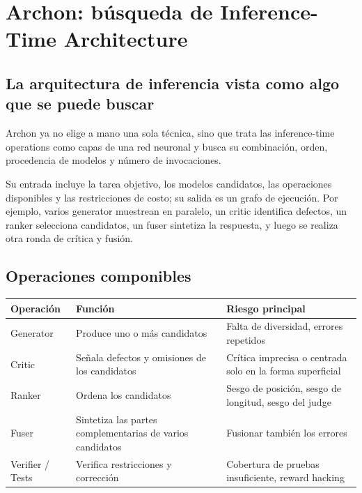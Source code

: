 \section{Archon: búsqueda de Inference-Time Architecture}

\subsection{La arquitectura de inferencia vista como algo que se puede buscar}

Archon ya no elige a mano una sola técnica, sino que trata las inference-time operations como capas de una red neuronal y busca su combinación, orden, procedencia de modelos y número de invocaciones.


Su entrada incluye la tarea objetivo, los modelos candidatos, las operaciones disponibles y las restricciones de costo; su salida es un grafo de ejecución. Por ejemplo, varios generator muestrean en paralelo, un critic identifica defectos, un ranker selecciona candidatos, un fuser sintetiza la respuesta, y luego se realiza otra ronda de crítica y fusión.

\subsection{Operaciones componibles}


\begin{table}[H]
\centering
\small
\begin{tabular}{p{2.8cm}p{5.1cm}p{5.7cm}}
\toprule
\textbf{Operación} & \textbf{Función} & \textbf{Riesgo principal} \\
\midrule
Generator & Produce uno o más candidatos & Falta de diversidad, errores repetidos \\
Critic & Señala defectos y omisiones de los candidatos & Crítica imprecisa o centrada solo en la forma superficial \\
Ranker & Ordena los candidatos & Sesgo de posición, sesgo de longitud, sesgo del judge \\
Fuser & Sintetiza las partes complementarias de varios candidatos & Fusionar también los errores \\
Verifier / Tests & Verifica restricciones y corrección & Cobertura de pruebas insuficiente, reward hacking \\
\bottomrule
\end{tabular}
\end{table}

